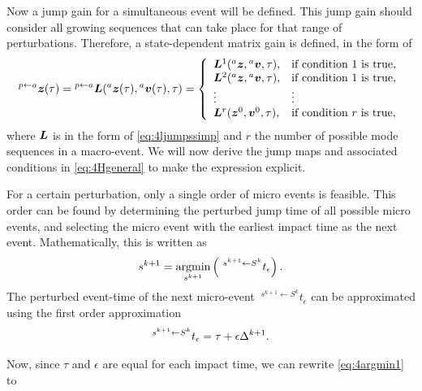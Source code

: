 \documentclass[../DC2017114Bouma.tex]{subfiles}
\begin{document}
Now a jump gain for a simultaneous event will be defined. This jump gain should consider all growing sequences that can take place for that range of perturbations. Therefore, a state-dependent matrix gain is defined, in the form of
\begin{align}
\hspace{0cm}^{p \leftarrow a}{\boldsymbol{z}}(\tau)= \hspace{0cm}^{p \leftarrow a}{\boldsymbol{L}}(\hspace{0cm}^{a}{\boldsymbol{z}}(\tau),\hspace{0cm}^{a}{\boldsymbol{v}}(\tau),\tau) = \left\lbrace\begin{array}{ll}
{\boldsymbol{L}}^1(\hspace{0cm}^{a}{\boldsymbol{z}},\hspace{0cm}^{a}{\boldsymbol{v}},\tau), & \text{if condition 1 is true},\\
{\boldsymbol{L}}^2(\hspace{0cm}^{a}{\boldsymbol{z}},\hspace{0cm}^{a}{\boldsymbol{v}},\tau), & \text{if condition 1 is true},\\
\vdots & \vdots\\
{\boldsymbol{L}}^{r}({\boldsymbol{z}}^0,{\boldsymbol{v}}^0,\tau), & \text{if condition }r\text{ is true},
\end{array}\right.\label{eq:4Hgeneral}
\end{align}
where ${\boldsymbol{L}}$ is in the form of \eqref{eq:4ljumpssimp} and $r$ the number of possible mode sequences in a macro-event. We will now derive the jump maps and associated conditions in \eqref{eq:4Hgeneral} to make the expression explicit.

For a certain perturbation, only a single order of micro events is feasible. This order can be found by determining the perturbed jump time of all possible micro events, and selecting the micro event with the earliest impact time as the next event. Mathematically, this is written as
\begin{align}
s^{k+1} = \underset{s^{k+1}}{\operatorname{\text{argmin}}}\left(\ ^{s^{k+1} \leftarrow S^{k}}t_\epsilon\right).\label{eq:4argmin1}
\end{align}
The perturbed event-time of the next micro-event $\ ^{s^{k+1} \leftarrow S^{k}}t_\epsilon$ can be approximated using the first order approximation
\begin{align}
\hspace{0cm}^{s^{k+1} \leftarrow S^{k}}t_\epsilon = \tau + \epsilon\Delta^{k+1}.
\end{align}

Now, since $\tau$ and $\epsilon$ are equal for each impact time, we can rewrite \eqref{eq:4argmin1} to
\end{document}
